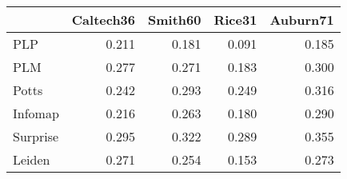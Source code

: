 \begin{tabular}{lrrrr}
\toprule
{} & Caltech36 & Smith60 & Rice31 & Auburn71 \\
\midrule
PLP      &     0.211 &   0.181 &  0.091 &    0.185 \\
PLM      &     0.277 &   0.271 &  0.183 &    0.300 \\
Potts    &     0.242 &   0.293 &  0.249 &    0.316 \\
Infomap  &     0.216 &   0.263 &  0.180 &    0.290 \\
Surprise &     0.295 &   0.322 &  0.289 &    0.355 \\
Leiden   &     0.271 &   0.254 &  0.153 &    0.273 \\
\bottomrule
\end{tabular}
